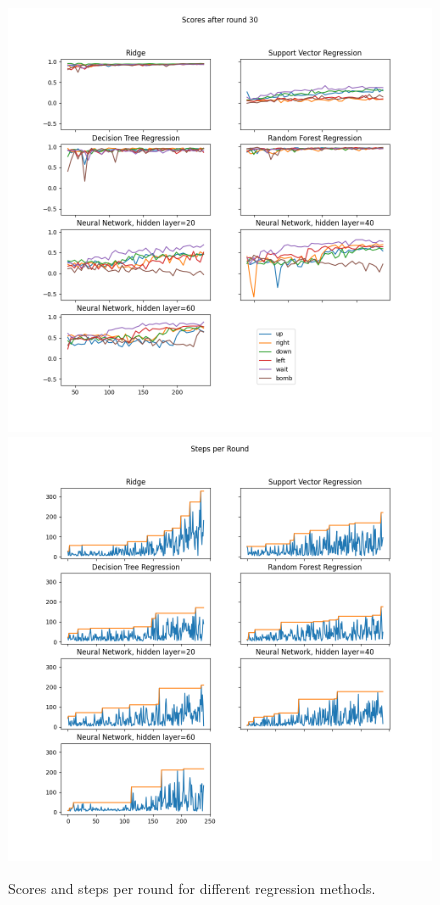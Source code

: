 \documentclass{article}
\begin{document}
\begin{figure}[h]
    \centering
    \begin{minipage}[c]{\textwidth}
    \includegraphics[scale=0.3]{plots/model_scores_after_round_30.png}
    \includegraphics[scale=0.3]{plots/steps_per_round.png}
\end{minipage}

    \caption{Scores and steps per round for different regression methods.}
    \label{fig:scores_and_steps}
\end{figure}
\end{document}
